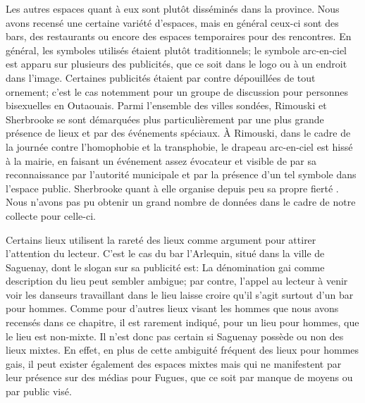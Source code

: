 Les autres espaces quant à eux sont plutôt disséminés dans la province.
Nous avons recensé une certaine variété d'espaces, mais en général ceux-ci sont des bars, des restaurants ou encore des espaces temporaires pour des rencontres.
En général, les symboles utilisés étaient plutôt traditionnels; le symbole arc-en-ciel est apparu sur plusieurs des publicités, que ce soit dans le logo ou à un endroit dans l'image.
Certaines publicités étaient par contre dépouillées de tout ornement; c'est le cas notemment pour un groupe de discussion pour personnes bisexuelles en Outaouais.
Parmi l'ensemble des villes sondées, Rimouski et Sherbrooke se sont démarquées plus particulièrement par une plus grande présence de lieux et par des événements spéciaux.
À Rimouski, dans le cadre de la journée contre l'homophobie et la transphobie, le drapeau arc-en-ciel est hissé à la mairie, en faisant un événement assez évocateur et visible de par sa reconnaissance par l'autorité municipale et par la présence d'un tel symbole dans l'espace public.
Sherbrooke quant à elle organise depuis peu sa propre fierté \lgbt{}. 
Nous n'avons pas pu obtenir un grand nombre de données dans le cadre de notre collecte pour celle-ci.

Certains lieux utilisent la rareté des lieux \lgbt{} comme argument pour attirer l'attention du lecteur.
C'est le cas du bar l'Arlequin, situé dans la ville de Saguenay, dont le slogan sur sa publicité est: 
La dénomination gai comme description du lieu peut sembler ambigue; par contre, l'appel au lecteur à venir voir les danseurs travaillant dans le lieu laisse croire qu'il s'agit surtout d'un bar pour hommes.
Comme pour d'autres lieux visant les hommes que nous avons recensés dans ce chapitre, il est rarement indiqué, pour un lieu pour hommes, que le lieu est non-mixte.
Il n'est donc pas certain si Saguenay possède ou non des lieux mixtes.
En effet, en plus de cette ambiguité fréquent des lieux pour hommes gais, il peut exister également des espaces mixtes mais qui ne manifestent par leur présence sur des médias pour Fugues, que ce soit par manque de moyens ou par public visé.

